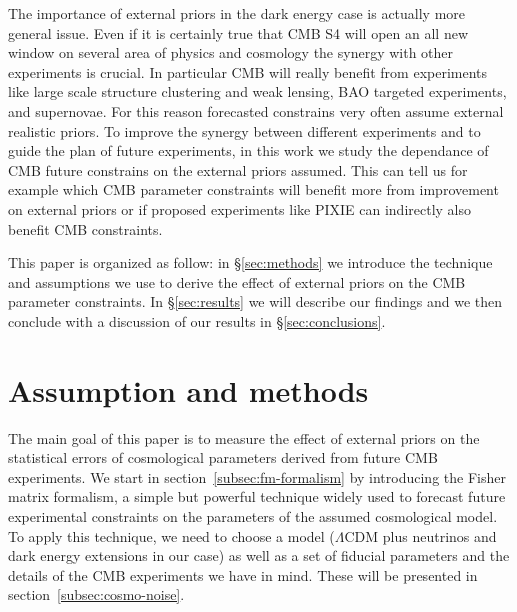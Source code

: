 \documentclass[aps,prd,preprint,groupedaddress]{revtex4-1}
\newcommand\refsec[1]{\S\ref{sec:#1}}
\newcommand{\refssec}[1]{section~\ref{subsec:#1}}
\begin{document}
The importance of external priors in the dark energy case is actually more general issue. Even if it is certainly true that CMB S4 will open an all new window on several area of physics and cosmology the synergy with other experiments is crucial. In particular CMB will really benefit from experiments like large scale structure clustering and weak lensing, BAO targeted experiments, and supernovae. 
For this reason forecasted constrains very often assume external realistic priors. To improve the synergy between different experiments and to guide the plan of future experiments, in this work we study the dependance of CMB future constrains on the external priors assumed.
This can tell us for example which CMB parameter constraints will benefit more from improvement on external priors or if proposed experiments like PIXIE \cite{2011JCAP...07..025K} can indirectly also benefit CMB constraints. 

This paper is organized as follow: in \refsec{methods} we introduce the technique and assumptions we use to derive the effect of external priors on the CMB parameter constraints. In \refsec{results} we will describe our findings and we then conclude with a discussion of our results in \refsec{conclusions}.



\section{Assumption and methods \label{sec:methods}}
The main goal of this paper is to measure the effect of external priors on the statistical errors of cosmological parameters derived from future CMB experiments.
We start in \refssec{fm-formalism} by introducing the Fisher matrix formalism, a simple but powerful technique widely used to forecast future experimental constraints on the parameters of the assumed cosmological model. To apply this technique, we need to choose a model ($\Lambda$CDM plus neutrinos and dark energy extensions in our case) as well as a set of fiducial parameters and the details of the CMB experiments we have in mind. These will be presented in \refssec{cosmo-noise}.
\end{document}
